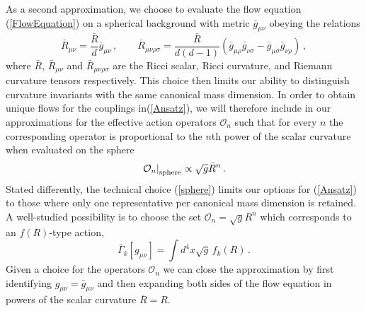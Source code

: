 \documentclass[notitlepage,eqsecnum,bm,amsmath,preprintnumbers,superscriptaddress,nofootinbib,aps,11pt]{revtex4-1}
\def\eq#1{(\ref{#1})}
\def\bR{\bar R}
\def\beq{\begin{equation}}
\def\eeq{\end{equation}}
\begin{document}
As a second approximation, we choose to evaluate the flow equation \eq{FlowEquation} on a spherical background with metric $\bar{g}_{\mu\nu} $
obeying the relations
\begin{equation}\label{sphere}
\bR_{\mu\nu}=\frac{\bR}{d}  \bar g_{\mu\nu} \,, \qquad 
\bR_{\mu\nu\rho\sigma}=\frac{\bR}{d(d-1)}\left(  \bar  g_{\mu\rho}  \bar  g_{\nu\sigma}-  \bar  g_{\mu\sigma}  \bar  g_{\nu\rho}\right)\,,
\end{equation}
where $\bR$, $\bR_{\mu\nu}$ and $\bR_{\mu\nu\rho\sigma}$ are the Ricci scalar, Ricci curvature, and Riemann curvature tensors respectively.
This choice then limits our ability to distinguish curvature invariants with the same canonical mass dimension. In order to obtain unique flows for the couplings in\eq{Ansatz},
we will therefore include in our approximations for the effective action operators $\mathcal{O}_n$ 
such that for every $n$ the corresponding operator is proportional to the $n$th power of the scalar curvature when evaluated on the sphere
\beq \label{Oinvariant}
\left.\mathcal{O}_n\right|_{\rm sphere}   \propto \sqrt{g} \bR^n \,.
\eeq
Stated differently, the technical choice \eq{sphere} limits our options for \eq{Ansatz} to those where only one representative per canonical mass dimension is retained.  A well-studied possibility is to choose the set $\mathcal{O}_n = \sqrt{g} R^n$ which corresponds to  an $f(R)$-type action,
\beq\label{fofr}
{\bar\Gamma}_k[g_{\mu\nu}]  = \int d^4x  \sqrt{g} 
\, f_k(R)    \,.
\eeq
Given a choice for the operators $\mathcal{O}_n$ we can close the approximation by first identifying $g_{\mu\nu} = \bar{g}_{\mu\nu}$ and then expanding both sides of the flow equation in powers of the scalar curvature $\bar{R} = R$. 
\end{document}
